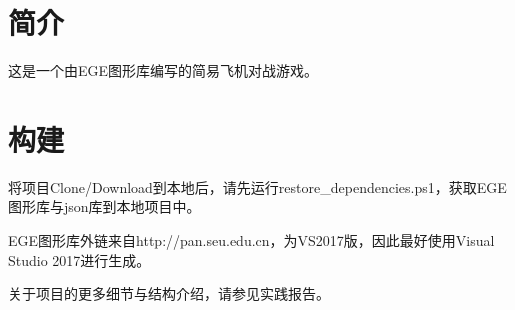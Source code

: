 \hypertarget{index_intro_sec}{}\section{简介}\label{index_intro_sec}
这是一个由\+E\+G\+E图形库编写的简易飞机对战游戏。\hypertarget{index_build_sec}{}\section{构建}\label{index_build_sec}
将项目\+Clone/\+Download到本地后，请先运行restore\+\_\+dependencies.ps1，获取\+E\+G\+E图形库与json库到本地项目中。
\begin{DoxyItemize}
\item E\+G\+E图形库外链来自http\+://pan.seu.\+edu.\+cn，为\+V\+S2017版，因此最好使用\+Visual Studio 2017进行生成。
\end{DoxyItemize}



 关于项目的更多细节与结构介绍，请参见实践报告。 